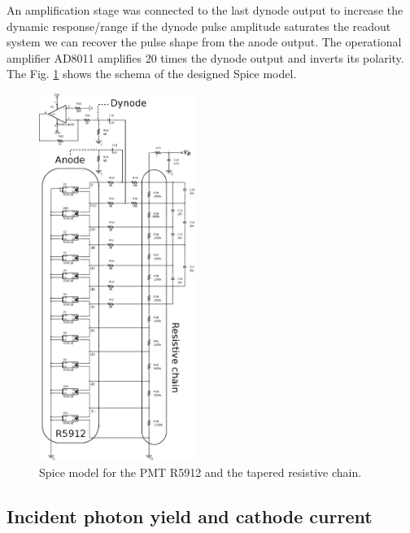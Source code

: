 \documentclass[letterpaper, 10 pt, conference]{ieeeconf}  %
\begin{document}
An amplification stage was connected to the last dynode output to increase the dynamic response/range if the dynode pulse amplitude saturates the readout system we can recover the pulse shape from the anode output. The operational amplifier AD8011 amplifies 20 times the dynode output and inverts its polarity. The Fig. \ref{Circuit} shows the schema of the designed Spice model.


\begin{figure}[h!]
\begin{center}
\includegraphics[width=0.45\textwidth]{Figures/Circuit}
\caption{Spice model for the PMT R5912 and the tapered resistive chain.}
\label{Circuit}
\end{center}
\end{figure}

\subsection{Incident photon yield and cathode current}
\end{document}
